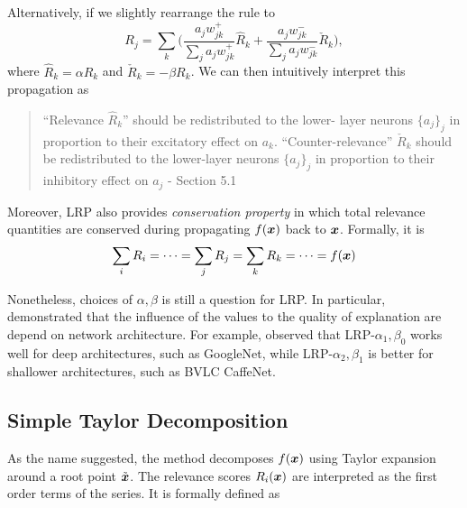 Alternatively, if we slightly rearrange  the rule to 
$$
	R_j = \sum_{k} \bigg( \frac{a_j w_{jk}^+}{\sum_{j} a_jw_{jk}^+} \hat{R}_{k} + \frac{a_j w_{jk}^-}{\sum_{j} a_jw_{jk}^-} \check{R}_{k} \bigg),
$$ 
where $\hat{R}_{k}  = \alpha R_{k}$ and  $\check{R}_{k} = -\beta R_{k} $. We can then intuitively interpret this propagation as 

\begin{quote}
``Relevance $\hat{R}_k$'' should be redistributed to the lower-
layer neurons $\{a_j\}_j$ in proportion to their excitatory effect on $a_k$. ``Counter-relevance'' $\check{R}_k $ should be redistributed to the lower-layer neurons $\{a_j\}_j$ in proportion to their inhibitory effect on $a_j$
	- Section 5.1 \cite{MontavonMethodsInterpretingUnderstanding2017}
\end{quote} 

Moreover, LRP also provides \textit{conservation property} in which total relevance quantities are conserved during propagating $f(\patvector{x})$ back to $\boldsymbol{x}$. Formally, it is 
\begin{align}
	\sum_{i} R_i =  \cdots =	\sum_{j} R_j = \sum_{k} R_k = \cdots = f(\patvector{x})
\end{align}


Nonetheless, choices of $\alpha,\beta$ is still a question for LRP.  In particular, \cite{MontavonMethodsInterpretingUnderstanding2017, BinderLayerWiseRelevancePropagation2016} demonstrated that the influence of the values to the quality of explanation are depend on network architecture. For example, \cite{MontavonMethodsInterpretingUnderstanding2017} observed that LRP-${\alpha_1, \beta_0}$ works well for deep architectures, such as GoogleNet\cite{SzegedyGoingDeeperConvolutions2014}, while LRP-${\alpha_2, \beta_1}$ is better for shallower architectures, such as BVLC CaffeNet\cite{JiaCaffeConvolutionalArchitecture2014}.


%




\subsection{Simple Taylor Decomposition}
As the name suggested,  the method decomposes $f(\patvector{x})$ using Taylor expansion around a root point $\tilde{\boldsymbol{x}}$. The relevance scores $R_i(\boldsymbol{x})$ are interpreted as the first order terms of the series. It is formally defined as 

